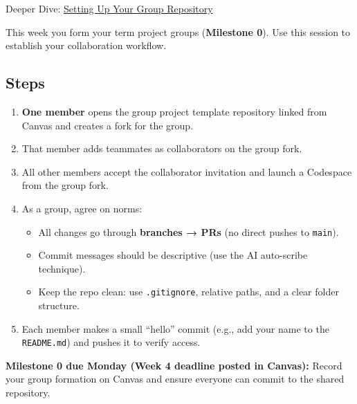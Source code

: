 \documentclass[
  letterpaper,
  DIV=11,
  numbers=noendperiod,
  oneside]{scrreprt}
\providecommand{\tightlist}{%
  \setlength{\itemsep}{0pt}\setlength{\parskip}{0pt}}
\begin{document}

Deeper Dive: \href{git07-group-repository.qmd}{Setting Up Your Group
Repository}

This week you form your term project groups (\textbf{Milestone 0}). Use
this session to establish your collaboration workflow.

\subsection*{Steps}\label{steps-4}

\begin{enumerate}
\def\labelenumi{\arabic{enumi}.}
\tightlist
\item
  \textbf{One member} opens the group project template repository linked
  from Canvas and creates a fork for the group.
\item
  That member adds teammates as collaborators on the group fork.
\item
  All other members accept the collaborator invitation and launch a
  Codespace from the group fork.
\item
  As a group, agree on norms:

  \begin{itemize}
  \tightlist
  \item
    All changes go through \textbf{branches → PRs} (no direct pushes to
    \texttt{main}).
  \item
    Commit messages should be descriptive (use the AI auto-scribe
    technique).
  \item
    Keep the repo clean: use \texttt{.gitignore}, relative paths, and a
    clear folder structure.
  \end{itemize}
\item
  Each member makes a small ``hello'' commit (e.g., add your name to the
  \texttt{README.md}) and pushes it to verify access.
\end{enumerate}

\begin{tcolorbox}[enhanced jigsaw, title=\textcolor{quarto-callout-note-color}{\faInfo}\hspace{0.5em}{Note}, arc=.35mm, toptitle=1mm, colframe=quarto-callout-note-color-frame, toprule=.15mm, leftrule=.75mm, bottomtitle=1mm, opacityback=0, bottomrule=.15mm, coltitle=black, breakable, opacitybacktitle=0.6, titlerule=0mm, colback=white, left=2mm, colbacktitle=quarto-callout-note-color!10!white, rightrule=.15mm]

\textbf{Milestone 0 due Monday (Week 4 deadline posted in Canvas):}
Record your group formation on Canvas and ensure everyone can commit to
the shared repository.

\end{tcolorbox}
\end{document}

